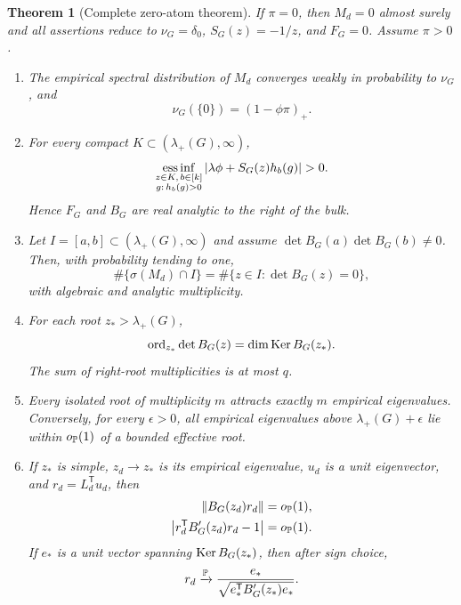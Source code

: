 \documentclass[
  aps,
  prl,
  10pt,
  onecolumn,
  longbibliography,
  nofootinbib
]{revtex4-2}
\newtheorem{theorem}{Theorem}
\theoremstyle{remark}
\begin{document}
\begin{theorem}[Complete zero-atom theorem]
\label{S:main}
If $\pi=0$, then $M_d=0$ almost surely and all assertions reduce to
$\nu_G=\delta_0$, $S_G(z)=-1/z$, and $F_G=0$. Assume $\pi>0$.
\begin{enumerate}
\item The empirical spectral distribution of $M_d$ converges weakly in probability to $\nu_G$, and
\begin{equation}
\nu_G(\{0\})=(1-\phi\pi)_+.
\label{S:zeroatom}
\end{equation}

\item For every compact $K\subset(\lambda_+(G),\infty)$,
\begin{equation}
\essinf_{\substack{z\in K,\,b\in[k]\\g:\,h_b(g)>0}}
\left|\lambda\phi+S_G(z)h_b(g)\right|>0.
\label{S:denominator}
\end{equation}
Hence $F_G$ and $B_G$ are real analytic to the right of the bulk.

\item Let $I=[a,b]\subset(\lambda_+(G),\infty)$ and assume
$\det B_G(a)\det B_G(b)\ne0$. Then, with probability tending to one,
\begin{equation}
\#\{\sigma(M_d)\cap I\}
=
\#\{z\in I:\det B_G(z)=0\},
\label{S:count}
\end{equation}
with algebraic and analytic multiplicity.

\item For each root $z_*>\lambda_+(G)$,
\begin{equation}
\operatorname{ord}_{z_*}\det B_G(z)=\dim\operatorname{Ker} B_G(z_*).
\label{S:multiplicity}
\end{equation}
The sum of right-root multiplicities is at most $q$.

\item Every isolated root of multiplicity $m$ attracts exactly $m$ empirical eigenvalues. Conversely, for every $\epsilon>0$, all empirical eigenvalues above $\lambda_+(G)+\epsilon$ lie within $o_{\mathbb{P}}(1)$ of a bounded effective root.

\item If $z_*$ is simple, $z_d\to z_*$ is its empirical eigenvalue, $u_d$ is a unit eigenvector, and $r_d=L_d^{\mathsf T}u_d$, then
\begin{align}
\|B_G(z_d)r_d\|&=o_{\mathbb{P}}(1),\label{S:evec1}\\
\left|r_d^{\mathsf T}B_G'(z_d)r_d-1\right|&=o_{\mathbb{P}}(1).
\label{S:evec2}
\end{align}
If $e_*$ is a unit vector spanning $\operatorname{Ker} B_G(z_*)$, then after sign choice,
\begin{equation}
r_d\xrightarrow{\mathbb{P}}
\frac{e_*}{\sqrt{e_*^{\mathsf T}B_G'(z_*)e_*}}.
\label{S:eveclimit}
\end{equation}


\end{enumerate}
\end{theorem}
\end{document}
